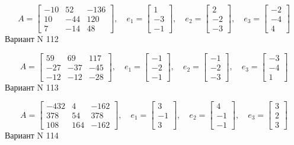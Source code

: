 \documentclass[11pt]{report}
\begin{document}
$$A = \left[\begin{matrix}-10 & 52 & -136\\10 & -44 & 120\\7 & -14 & 48\end{matrix}\right],\quad e_1 = \left[\begin{matrix}1\\-3\\-1\end{matrix}\right],\quad e_2 = \left[\begin{matrix}2\\-2\\-3\end{matrix}\right],\quad e_3 = \left[\begin{matrix}-2\\-4\\4\end{matrix}\right]$$Вариант N 112

$$A = \left[\begin{matrix}59 & 69 & 117\\-27 & -37 & -45\\-12 & -12 & -28\end{matrix}\right],\quad e_1 = \left[\begin{matrix}-1\\-2\\-1\end{matrix}\right],\quad e_2 = \left[\begin{matrix}-1\\-2\\-3\end{matrix}\right],\quad e_3 = \left[\begin{matrix}-3\\-4\\1\end{matrix}\right]$$Вариант N 113

$$A = \left[\begin{matrix}-432 & 4 & -162\\378 & 54 & 378\\108 & 164 & -162\end{matrix}\right],\quad e_1 = \left[\begin{matrix}3\\-1\\3\end{matrix}\right],\quad e_2 = \left[\begin{matrix}4\\-1\\-1\end{matrix}\right],\quad e_3 = \left[\begin{matrix}3\\2\\3\end{matrix}\right]$$Вариант N 114
\end{document}
